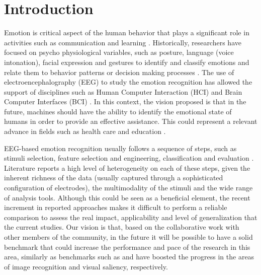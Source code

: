 \documentclass{sig-alternate}
\begin{document}


\section{Introduction}
Emotion is critical aspect of the human behavior that plays 
a  significant role in  activities such as communication and 
learning \cite{}.  Historically, researchers have focused on psycho 
physiological variables, such as posture, language 
(voice intonation), facial expression and gestures to identify 
and classify emotions and relate them to behavior patterns 
 or decision making processes \cite{}.
The use of electroencephalography (EEG) to study the 
emotion recognition  has allowed the 
support of disciplines such as Human Computer Interaction 
(HCI) and Brain Computer Interfaces (BCI) \cite{}. In this context, 
the vision proposed is that in the future, machines should 
have the ability to identify the emotional state of humans 
in order to provide an effective assistance. This could 
represent a relevant advance in fields such as health care 
and education \cite{}.

EEG-based emotion recognition usually follows a sequence 
of steps, such as  stimuli selection, feature selection and 
engineering, classification and evaluation \cite{}. Literature 
reports a high level of heterogeneity on each of these steps, 
given the inherent richness of the data (usually captured 
through  a sophisticated configuration of electrodes), the 
multimodality  of the stimuli and the wide range of analysis 
tools. Although this could be seen as a beneficial element, 
the recent increment in reported approaches makes it 
difficult to perform a reliable  comparison to assess the 
real impact, applicability  and level  of generalization that 
the current studies.  Our vision is that, 
based on the collaborative work with other members of the 
community, in the future it will be possible to have a solid 
benchmark that could increase the performance and pace 
of the research in this area, similarly as benchmarks such 
as  \cite{ILSVRC15} and \cite{Judd_2012} have boosted 
the progress in the areas of image recognition and visual 
saliency, respectively. 
\end{document}
